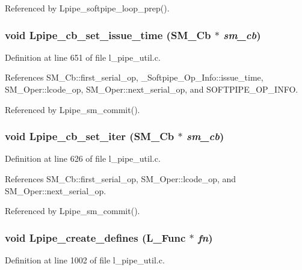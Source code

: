 Referenced by Lpipe\_\-softpipe\_\-loop\_\-prep().
\subsubsection{\setlength{\rightskip}{0pt plus 5cm}void Lpipe\_\-cb\_\-set\_\-issue\_\-time (\bf{SM\_\-Cb} $\ast$ {\em sm\_\-cb})}\label{l__pipe__util_8c_0b7f0cae0da09da3e5d8b982be9873e0}




Definition at line 651 of file l\_\-pipe\_\-util.c.

References SM\_\-Cb::first\_\-serial\_\-op, \_\-Softpipe\_\-Op\_\-Info::issue\_\-time, SM\_\-Oper::lcode\_\-op, SM\_\-Oper::next\_\-serial\_\-op, and SOFTPIPE\_\-OP\_\-INFO.

Referenced by Lpipe\_\-sm\_\-commit().
\subsubsection{\setlength{\rightskip}{0pt plus 5cm}void Lpipe\_\-cb\_\-set\_\-iter (\bf{SM\_\-Cb} $\ast$ {\em sm\_\-cb})}\label{l__pipe__util_8c_d0e4be247037cc75bcca0eeebb56dc71}




Definition at line 626 of file l\_\-pipe\_\-util.c.

References SM\_\-Cb::first\_\-serial\_\-op, SM\_\-Oper::lcode\_\-op, and SM\_\-Oper::next\_\-serial\_\-op.

Referenced by Lpipe\_\-sm\_\-commit().
\subsubsection{\setlength{\rightskip}{0pt plus 5cm}void Lpipe\_\-create\_\-defines (L\_\-Func $\ast$ {\em fn})}\label{l__pipe__util_8c_689850f1f56bc56b23c950658e5aba87}




Definition at line 1002 of file l\_\-pipe\_\-util.c.

